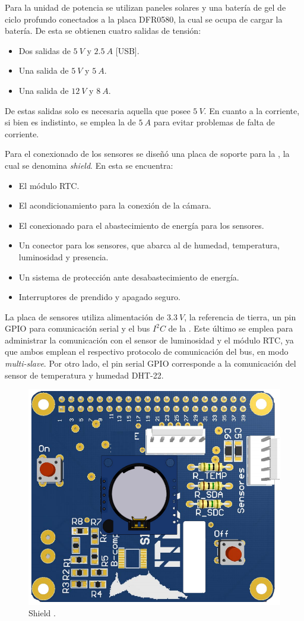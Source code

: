 
Para la unidad de potencia se utilizan paneles solares y una batería de gel de ciclo profundo conectados a la placa DFR0580, la cual se ocupa de cargar la batería. De esta se obtienen cuatro salidas de tensión:
\begin{itemize}
	\item Dos salidas de $5 \ V$ y $2.5 \ A$ [USB].
	\item Una salida de $5 \ V$ y $5 \ A$.
	\item Una salida de $12 \ V$ y $8 \ A$.
\end{itemize}
De estas salidas solo es necesaria aquella que posee $5 \ V$. En cuanto a la corriente, si bien es indistinto, se emplea la de $5 \ A$ para evitar problemas de falta de corriente.

Para el conexionado de los sensores se diseñó una placa de soporte para la \rspi, la cual se denomina \textit{shield}. En esta se encuentra:
\begin{itemize}
	\item El módulo RTC.
	\item El acondicionamiento para la conexión de la cámara.
	\item El conexionado para el abastecimiento de energía para los sensores.
	\item Un conector para los sensores, que abarca al de humedad, temperatura, luminosidad y presencia.
	\item Un sistema de protección ante desabastecimiento de energía.
	\item Interruptores de prendido y apagado seguro.
\end{itemize}

La placa de sensores utiliza alimentación de $3.3 \ V$, la referencia de tierra, un pin GPIO para comunicación serial y el bus $I^2C$ de la \rpi. Este último se emplea para administrar la comunicación con el sensor de luminosidad y el módulo RTC, ya que ambos emplean el respectivo protocolo de comunicación del bus, en modo \textit{multi-slave}. Por otro lado, el pin serial GPIO corresponde a la comunicación del sensor de temperatura y humedad DHT-22. 
\begin{figure}[H]
	\centering
	\includegraphics[width=0.75\linewidth,page=1]{ImagenesIngenieria de Detalle/shield}		
	\caption{Shield \rspi.}
	\label{fig:conexionado_Rpi}
\end{figure}

